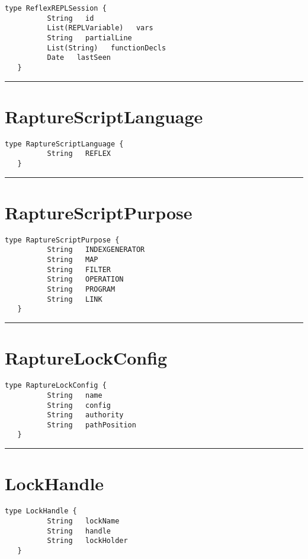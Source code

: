 \begin{lstlisting}[style=nonumbers]
   type ReflexREPLSession {
          String   id
          List(REPLVariable)   vars
          String   partialLine
          List(String)   functionDecls
          Date   lastSeen
   }
\end{lstlisting}

\rule{12cm}{2pt}
\section{RaptureScriptLanguage}
\label{type:RaptureScriptLanguage}

\begin{lstlisting}[style=nonumbers]
   type RaptureScriptLanguage {
          String   REFLEX
   }
\end{lstlisting}

\rule{12cm}{2pt}
\section{RaptureScriptPurpose}
\label{type:RaptureScriptPurpose}

\begin{lstlisting}[style=nonumbers]
   type RaptureScriptPurpose {
          String   INDEXGENERATOR
          String   MAP
          String   FILTER
          String   OPERATION
          String   PROGRAM
          String   LINK
   }
\end{lstlisting}

\rule{12cm}{2pt}
\section{RaptureLockConfig}
\label{type:RaptureLockConfig}

\begin{lstlisting}[style=nonumbers]
   type RaptureLockConfig {
          String   name
          String   config
          String   authority
          String   pathPosition
   }
\end{lstlisting}

\rule{12cm}{2pt}
\section{LockHandle}
\label{type:LockHandle}

\begin{lstlisting}[style=nonumbers]
   type LockHandle {
          String   lockName
          String   handle
          String   lockHolder
   }
\end{lstlisting}

